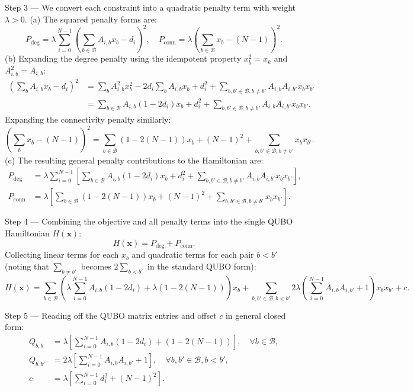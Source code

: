 \documentclass[12pt]{article}
\begin{document}
Step 3 --- We convert each constraint into a quadratic penalty term with weight $\lambda > 0$.
(a) The squared penalty forms are:
\[ P_{\text{deg}} = \lambda \sum_{i=0}^{N-1} \left( \sum_{b \in \mathcal{B}} A_{i,b} x_b - d_i \right)^2, \quad P_{\text{conn}} = \lambda \left( \sum_{b \in \mathcal{B}} x_b - (N-1) \right)^2. \]
(b) Expanding the degree penalty using the idempotent property $x_b^2 = x_k$ and $A_{i,b}^2 = A_{i,b}$:
\begin{align}
\left( \sum_{b} A_{i,b} x_b - d_i \right)^2 &= \sum_{b} A_{i,b}^2 x_b^2 - 2d_i \sum_{b} A_{i,b} x_b + d_i^2 + \sum_{b, b' \in \mathcal{B}, b \neq b'} A_{i,b} A_{i,b'} x_b x_{b'} \nonumber \\
&= \sum_{b \in \mathcal{B}} A_{i,b}(1 - 2d_i) x_b + d_i^2 + \sum_{b, b' \in \mathcal{B}, b \neq b'} A_{i,b} A_{i,b'} x_b x_{b'}.
\end{align}
Expanding the connectivity penalty similarly:
\[ \left( \sum_{b} x_b - (N-1) \right)^2 = \sum_{b \in \mathcal{B}} (1 - 2(N-1)) x_b + (N-1)^2 + \sum_{b, b' \in \mathcal{B}, b \neq b'} x_b x_{b'}. \]
(c) The resulting general penalty contributions to the Hamiltonian are:
\begin{align}
P_{\text{deg}} &= \lambda \sum_{i=0}^{N-1} \left[ \sum_{b \in \mathcal{B}} A_{i,b}(1 - 2d_i) x_b + d_i^2 + \sum_{b, b' \in \mathcal{B}, b \neq b'} A_{i,b} A_{i,b'} x_b x_{b'} \right], \\
P_{\text{conn}} &= \lambda \left[ \sum_{b \in \mathcal{B}} (1 - 2(N-1)) x_b + (N-1)^2 + \sum_{b, b' \in \mathcal{B}, b \neq b'} x_b x_{b'} \right].
\end{align}

Step 4 --- Combining the objective and all penalty terms into the single QUBO Hamiltonian $H(\mathbf{x})$:
\[ H(\mathbf{x}) = P_{\text{deg}} + P_{\text{conn}}. \]
Collecting linear terms for each $x_b$ and quadratic terms for each pair $b < b'$ (noting that $\sum_{b \neq b'}$ becomes $2\sum_{b < b'}$ in the standard QUBO form):
\[ H(\mathbf{x}) = \sum_{b \in \mathcal{B}} \left( \lambda \sum_{i=0}^{N-1} A_{i,b}(1 - 2d_i) + \lambda(1 - 2(N-1)) \right) x_b + \sum_{b, b' \in \mathcal{B}, b < b'} 2\lambda \left( \sum_{i=0}^{N-1} A_{i,b} A_{i,b'} + 1 \right) x_b x_{b'} + c. \]

Step 5 --- Reading off the QUBO matrix entries and offset $c$ in general closed form:
\begin{align}
Q_{b,b} &= \lambda \left[ \sum_{i=0}^{N-1} A_{i,b}(1 - 2d_i) + (1 - 2(N-1)) \right], \quad \forall b \in \mathcal{B}, \\
Q_{b,b'} &= 2\lambda \left[ \sum_{i=0}^{N-1} A_{i,b} A_{i,b'} + 1 \right], \quad \forall b, b' \in \mathcal{B}, b < b', \\
c &= \lambda \left[ \sum_{i=0}^{N-1} d_i^2 + (N-1)^2 \right].
\end{align}
\end{document}

